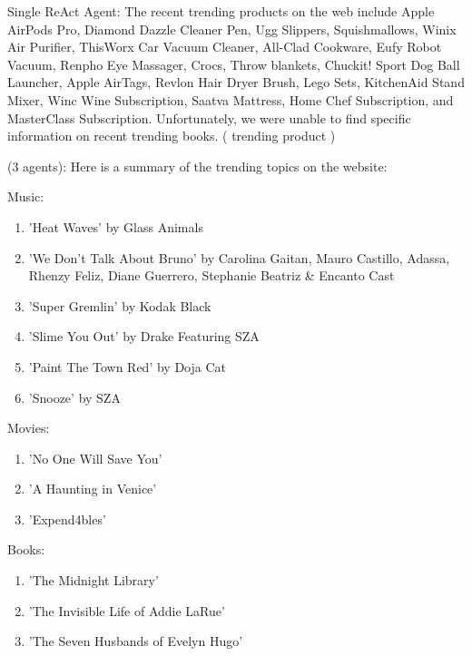 {\color{blue} Single ReAct Agent}: The recent trending products on the web include Apple AirPods Pro, Diamond Dazzle Cleaner Pen, Ugg Slippers, Squishmallows, Winix Air Purifier, ThisWorx Car Vacuum Cleaner, All-Clad Cookware, Eufy Robot Vacuum, Renpho Eye Massager, Crocs, Throw blankets, Chuckit! Sport Dog Ball Launcher, Apple AirTags, Revlon Hair Dryer Brush, Lego Sets, KitchenAid Stand Mixer, Winc Wine Subscription, Saatva Mattress, Home Chef Subscription, and MasterClass Subscription. Unfortunately, we were unable to find specific information on recent trending books. ({\color{teal} trending product \cmark})

{\color{magenta} \framework (3 agents)}: Here is a summary of the trending topics on the website:

Music:
\begin{enumerate}[noitemsep,topsep=0pt,parsep=0pt,partopsep=0pt,leftmargin=2em]
    \item 'Heat Waves' by Glass Animals
    \item 'We Don't Talk About Bruno' by Carolina Gaitan, Mauro Castillo, Adassa, Rhenzy Feliz, Diane Guerrero, Stephanie Beatriz \& Encanto Cast
    \item 'Super Gremlin' by Kodak Black
    \item 'Slime You Out' by Drake Featuring SZA
    \item 'Paint The Town Red' by Doja Cat
    \item 'Snooze' by SZA
\end{enumerate}

Movies:
\begin{enumerate}[noitemsep,topsep=0pt,parsep=0pt,partopsep=0pt,leftmargin=2em]
    \item 'No One Will Save You'
    \item 'A Haunting in Venice'
    \item 'Expend4bles'
\end{enumerate}

Books:
\begin{enumerate}[noitemsep,topsep=0pt,parsep=0pt,partopsep=0pt,leftmargin=2em]
    \item 'The Midnight Library'
    \item 'The Invisible Life of Addie LaRue'
    \item 'The Seven Husbands of Evelyn Hugo'
\end{enumerate}

